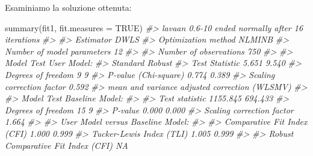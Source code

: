 \documentclass[
  11pt,
]{krantz}
\makeatletter
\newenvironment{Shaded}{\begin{snugshade}}{\end{snugshade}}
\newcommand{\AttributeTok}[1]{\textcolor[rgb]{0.61,0.61,0.61}{#1}}
\newcommand{\CommentTok}[1]{\textcolor[rgb]{0.37,0.37,0.37}{\textit{#1}}}
\newcommand{\ConstantTok}[1]{\textcolor[rgb]{0,0,0}{#1}}
\newcommand{\FunctionTok}[1]{\textcolor[rgb]{0,0,0}{#1}}
\newcommand{\NormalTok}[1]{#1}
\newenvironment{kframe}{%
\medskip{}
\setlength{\fboxsep}{.8em}
 \def\at@end@of@kframe{}%
 \ifinner\ifhmode%
  \def\at@end@of@kframe{\end{minipage}}%
  \begin{minipage}{\columnwidth}%
 \fi\fi%
 \def\FrameCommand##1{\hskip\@totalleftmargin \hskip-\fboxsep
 \colorbox{shadecolor}{##1}\hskip-\fboxsep
     \hskip-\linewidth \hskip-\@totalleftmargin \hskip\columnwidth}%
 \MakeFramed {\advance\hsize-\width
   \@totalleftmargin\z@ \linewidth\hsize
   \@setminipage}}%
 {\par\unskip\endMakeFramed%
 \at@end@of@kframe}
\renewenvironment{Shaded}{\begin{kframe}}{\end{kframe}}
\theoremstyle{definition}
\theoremstyle{definition}
\theoremstyle{definition}
\theoremstyle{definition}
\theoremstyle{remark}
\makeatother
\begin{document}
Esaminiamo la soluzione ottenuta:

\begin{Shaded}
\begin{Highlighting}[]
\FunctionTok{summary}\NormalTok{(fit1, }\AttributeTok{fit.measures =} \ConstantTok{TRUE}\NormalTok{)}
\CommentTok{\#\textgreater{} lavaan 0.6{-}10 ended normally after 16 iterations}
\CommentTok{\#\textgreater{} }
\CommentTok{\#\textgreater{}   Estimator                                       DWLS}
\CommentTok{\#\textgreater{}   Optimization method                           NLMINB}
\CommentTok{\#\textgreater{}   Number of model parameters                        12}
\CommentTok{\#\textgreater{}                                                       }
\CommentTok{\#\textgreater{}   Number of observations                           750}
\CommentTok{\#\textgreater{}                                                       }
\CommentTok{\#\textgreater{} Model Test User Model:}
\CommentTok{\#\textgreater{}                                                      Standard      Robust}
\CommentTok{\#\textgreater{}   Test Statistic                                        5.651       9.540}
\CommentTok{\#\textgreater{}   Degrees of freedom                                        9           9}
\CommentTok{\#\textgreater{}   P{-}value (Chi{-}square)                                  0.774       0.389}
\CommentTok{\#\textgreater{}   Scaling correction factor                                         0.592}
\CommentTok{\#\textgreater{}        mean and variance adjusted correction (WLSMV)                     }
\CommentTok{\#\textgreater{} }
\CommentTok{\#\textgreater{} Model Test Baseline Model:}
\CommentTok{\#\textgreater{} }
\CommentTok{\#\textgreater{}   Test statistic                              1155.845     694.433}
\CommentTok{\#\textgreater{}   Degrees of freedom                                15           9}
\CommentTok{\#\textgreater{}   P{-}value                                        0.000       0.000}
\CommentTok{\#\textgreater{}   Scaling correction factor                                  1.664}
\CommentTok{\#\textgreater{} }
\CommentTok{\#\textgreater{} User Model versus Baseline Model:}
\CommentTok{\#\textgreater{} }
\CommentTok{\#\textgreater{}   Comparative Fit Index (CFI)                    1.000       0.999}
\CommentTok{\#\textgreater{}   Tucker{-}Lewis Index (TLI)                       1.005       0.999}
\CommentTok{\#\textgreater{}                                                                   }
\CommentTok{\#\textgreater{}   Robust Comparative Fit Index (CFI)                            NA}

\end{Highlighting}
\end{Shaded}
\end{document}
